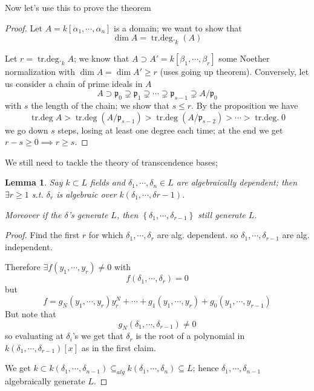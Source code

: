 \documentclass[11pt,a4paper]{article}
\theoremstyle{definition}
\theoremstyle{plain}
\newtheorem{lemma}[definition]{Lemma}
\theoremstyle{remark}
\renewcommand{\set}[1]{\left\{ #1 \right\}}
\begin{document}
Now let's use this to prove the theorem 
\begin{proof}
    Let $A = k[\alpha_1, \cdots, \alpha_n]$ is a domain; we want to show that 
    $$\dim A = \operatorname{tr.deg.}_k (A)$$

    Let $r = \operatorname{tr.deg.}_k A$; we know that $A \supset A' = k[\beta_1, \cdots, \beta_r]$ some Noether normalization
    with $\dim A = \dim A' \ge r$ (uses going up theorem). Conversely, let us consider a chain of prime ideals in $A$
    $$A \supset \mathfrak{p}_0 \supsetneq \mathfrak{p}_1 \supsetneq \cdots \supsetneq \mathfrak{p}_{s-1} \supsetneq A/\mathfrak{p}_0$$
    with $s$ the length of the chain; we show that $s \le r$. By the proposition we have 
    $$\operatorname{tr.deg} A > \operatorname{tr.deg} (A/\mathfrak{p}_{s-1}) > \operatorname{tr.deg} (A/\mathfrak{p}_{s-2}) > \cdots > \operatorname{tr.deg.} 0$$
    we go down $s$ steps, losing at least one degree each time; at the end we get $r-s \ge 0 \implies r \ge s$. 
\end{proof}

We still need to tackle the theory of transcendence bases; 
\begin{lemma}
    Say $k \subset L$ fields and $\delta_1, \cdots, \delta_n \in L$ are algebraically dependent; then $\exists r \ge 1$ s.t. 
    $\delta_r$ is algebraic over $k(\delta_1, \cdots, \delta{r-1})$. 

    Moreover if the $\delta$'s generate $L$, then $\set{\delta_1, \cdots, \delta_{r-1}}$ still generate $L$.
\end{lemma}

\begin{proof}
    Find the first $r$ for which $\delta_1, \cdots, \delta_r$ are alg. dependent. so $\delta_1, \cdots, \delta_{r-1}$ are alg. independent. 

    Therefore $\exists f(y_1, \cdots, y_r) \ne 0$ with 
    $$f(\delta_1, \cdots, \delta_r) = 0$$
    but 
    $$f = g_N(y_1, \cdots, y_r) y_r^N + \cdots + g_1 (y_1, \cdots, y_r) + g_0 (y_1, \cdots, y_{r-1})$$
    But note that 
    $$g_N(\delta_1, \cdots, \delta_{r-1}) \ne 0$$
    so evaluating at $\delta_i$'s we get that $\delta_r$ is the root of a polynomial in $k(\delta_1, \cdots, \delta_{r-1}) [x]$ 
    as in the first claim. 

    We get $k \subset k(\delta_1, \cdots, \delta_{n-1}) \subseteq_{alg} k(\delta_1, \cdots, \delta_n) \subseteq L$; hence 
    $\delta_1, \cdots, \delta_{n-1}$ algebraically generate $L$.  
\end{proof}
\end{document}
